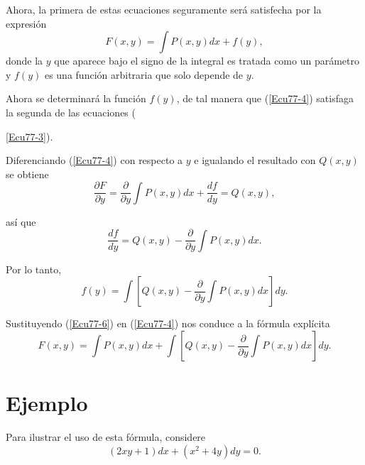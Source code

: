 \documentclass[12pt]{article}
\begin{document}

Ahora, la primera de estas ecuaciones seguramente ser\'{a} satisfecha por la expresi\'{o}n
\begin{equation}
 F(x,y)=\int P(x,y)dx+f(y),
 \label{Ecu77-4}
\end{equation}
donde la $y$ que aparece bajo el signo de la integral es tratada como un par\'{a}metro y $f(y)$ es una funci\'{o}n arbitraria que solo depende de $y$.



Ahora se determinar\'{a} la funci\'{o}n $f(y)$, de tal manera que (\ref{Ecu77-4}) satisfaga la segunda de las ecuaciones ({\ref{Ecu77-3}).


Diferenciando (\ref{Ecu77-4}) con respecto a $y$ e igualando el resultado con $Q(x,y)$ se obtiene
\begin{equation}
\frac{\partial F}{\partial y}=
\frac{\partial}{\partial y}\int P(x,y)dx+
\frac{df}{dy}=Q(x,y),
\end{equation}


as\'{i} que
\begin{equation}
 \frac{df}{dy}=Q(x,y)-
\frac{\partial}{\partial y}\int P(x,y)dx.
\label{Ecu77-5}
\end{equation}


Por lo tanto,
\begin{equation}
 f(y)=\int\left[Q(x,y)-
\frac{\partial}{\partial y}\int P(x,y)dx\right]dy.
\label{Ecu77-6}
\end{equation}


Sustituyendo (\ref{Ecu77-6}) en (\ref{Ecu77-4}) nos conduce a la f\'{o}rmula expl\'{i}cita
\begin{equation}
 F(x,y)=\int P(x,y)dx+
\int\left[Q(x,y)-
\frac{\partial}{\partial y}\int P(x,y)dx\right]dy.
\label{Ecu77-7}
\end{equation}



\newpage

\section{Ejemplo}
Para ilustrar el uso de esta f\'{o}rmula, considere
\begin{equation}
 (2xy+1)dx+(x^{2}+4y)dy=0.
\end{equation}

}
\end{document}

